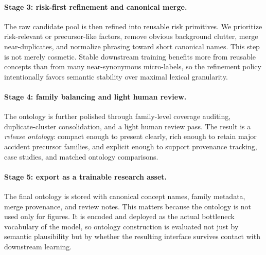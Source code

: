 \paragraph{Stage 3: risk-first refinement and canonical merge.}
The raw candidate pool is then refined into reusable risk primitives. We
prioritize risk-relevant or precursor-like factors, remove obvious
background clutter, merge near-duplicates, and normalize phrasing toward short
canonical names. This step is not merely cosmetic. Stable downstream training
benefits more from reusable concepts than from many near-synonymous
micro-labels, so the refinement policy intentionally favors semantic stability
over maximal lexical granularity.

\paragraph{Stage 4: family balancing and light human review.}
The ontology is further polished through family-level coverage auditing,
duplicate-cluster consolidation, and a light human review pass. The result is a
\emph{release ontology}: compact enough to present clearly, rich
enough to retain major accident precursor families, and explicit enough to
support provenance tracking, case studies, and matched ontology comparisons.

\paragraph{Stage 5: export as a trainable research asset.}
The final ontology is stored with canonical concept names, family metadata,
merge provenance, and review notes. This matters because the ontology is not
used only for figures. It is encoded and deployed as the actual bottleneck
vocabulary of the model, so ontology construction is evaluated not just by
semantic plausibility but by whether the resulting interface survives contact
with downstream learning.

